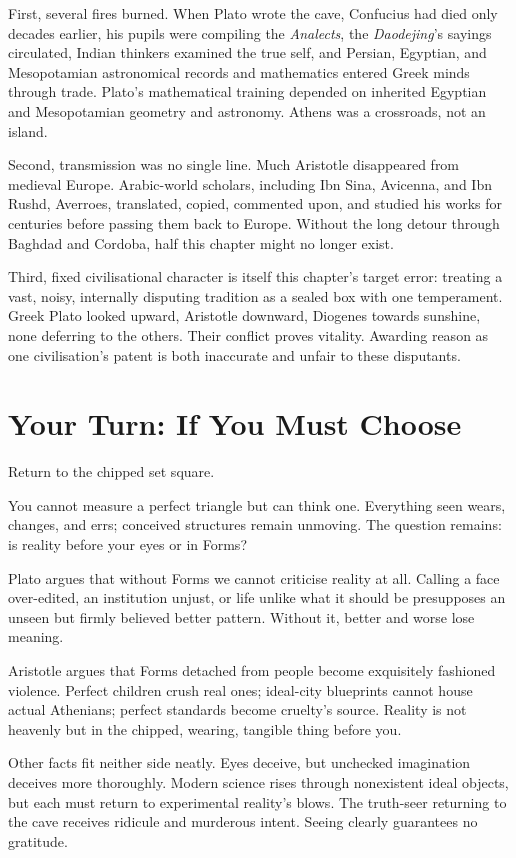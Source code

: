 First, several fires burned. When Plato wrote the cave, Confucius had died only decades earlier, his pupils were compiling the \textit{Analects}, the \textit{Daodejing}'s sayings circulated, Indian thinkers examined the true self, and Persian, Egyptian, and Mesopotamian astronomical records and mathematics entered Greek minds through trade. Plato's mathematical training depended on inherited Egyptian and Mesopotamian geometry and astronomy. Athens was a crossroads, not an island.

Second, transmission was no single line. Much Aristotle disappeared from medieval Europe. Arabic-world scholars, including Ibn Sina, Avicenna, and Ibn Rushd, Averroes, translated, copied, commented upon, and studied his works for centuries before passing them back to Europe. Without the long detour through Baghdad and Cordoba, half this chapter might no longer exist.

Third, fixed civilisational character is itself this chapter's target error: treating a vast, noisy, internally disputing tradition as a sealed box with one temperament. Greek Plato looked upward, Aristotle downward, Diogenes towards sunshine, none deferring to the others. Their conflict proves vitality. Awarding reason as one civilisation's patent is both inaccurate and unfair to these disputants.

\section{Your Turn: If You Must Choose}
Return to the chipped set square.

You cannot measure a perfect triangle but can think one. Everything seen wears, changes, and errs; conceived structures remain unmoving. The question remains: is reality before your eyes or in Forms?

Plato argues that without Forms we cannot criticise reality at all. Calling a face over-edited, an institution unjust, or life unlike what it should be presupposes an unseen but firmly believed better pattern. Without it, better and worse lose meaning.

Aristotle argues that Forms detached from people become exquisitely fashioned violence. Perfect children crush real ones; ideal-city blueprints cannot house actual Athenians; perfect standards become cruelty's source. Reality is not heavenly but in the chipped, wearing, tangible thing before you.

Other facts fit neither side neatly. Eyes deceive, but unchecked imagination deceives more thoroughly. Modern science rises through nonexistent ideal objects, but each must return to experimental reality's blows. The truth-seer returning to the cave receives ridicule and murderous intent. Seeing clearly guarantees no gratitude.

